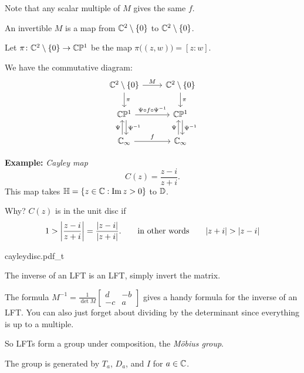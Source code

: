\documentclass[10pt,aspectratio=169]{beamer}
\begin{document}
\begin{frame}[fragile]
Note that any scalar multiple of $M$ gives the same $f$.

\medskip
\pause

An invertible $M$ is a map from
${\mathbb{C}}^2 \setminus \{ 0 \}$ to ${\mathbb{C}}^2 \setminus \{ 0 \}$.

\medskip

Let $\pi \colon {\mathbb{C}}^2 \setminus \{ 0 \} \to {\mathbb{C}} {\mathbb{P}}^1$ be the map
$\pi \bigl( (z,w) \bigr) =
[z:w]$. 

\medskip
\pause

We have the commutative diagram:
\begin{equation*}
\begin{tikzcd}
\C^2 \setminus \{ 0 \} \arrow[r,"M"] \arrow[d,"\pi"] &
\C^2 \setminus \{ 0 \} \arrow[d,"\pi"] \\
\C \bP^1 \arrow[r,"\Psi \circ f \circ \Psi^{-1}"] \arrow[d,shift left,"\Psi^{-1}"] &
\C \bP^1 \arrow[d,shift left,"\Psi^{-1}"]
\\
\C_\infty \arrow[r,"f"]\arrow[u,shift left,"\Psi"] &
\C_\infty \arrow[u,shift left,"\Psi"]
\end{tikzcd}
\end{equation*}

\end{frame}

\begin{frame}

\textbf{Example:}
\emph{Cayley map}
\begin{equation*}
C(z)
=
\frac{z - i}{z + i} .
\end{equation*}
\pause
This map takes ${\mathbb{H}} = \{ z \in {\mathbb{C}} : \operatorname{Im} z > 0 \}$ to ${\mathbb{D}}$.

\medskip
\pause

Why?  $C(z)$ is in the unit disc if
\begin{equation*}
1 > \left\lvert {\frac{z - i}{z + i} } \right\rvert
=
\frac{\lvert {z - i} \rvert}{\lvert {z + i} \rvert} .
\qquad \text{in other words} \qquad
\lvert {z+i} \rvert > \lvert {z - i} \rvert
\end{equation*}

\pause

\begin{center}
{cayleydisc.pdf_t}
\end{center}
\end{frame}

\begin{frame}
The inverse of an LFT is an LFT, simply invert the matrix.

\medskip
\pause

The formula $M^{-1} = \frac{1}{\det M}
\left[ \begin{smallmatrix} 
d & -b \\ -c & a
\end{smallmatrix} \right]$
gives a handy formula for the inverse
of an LFT.  You can also just forget about dividing by the determinant
since everything is up to a multiple.

\medskip
\pause

So LFTs form a group under composition,
the \emph{M\"obius group}.

\medskip
\pause

The group is generated by 
$T_a$, $D_a$, and $I$ for $a\in {\mathbb{C}}$.
\end{frame}
\end{document}

